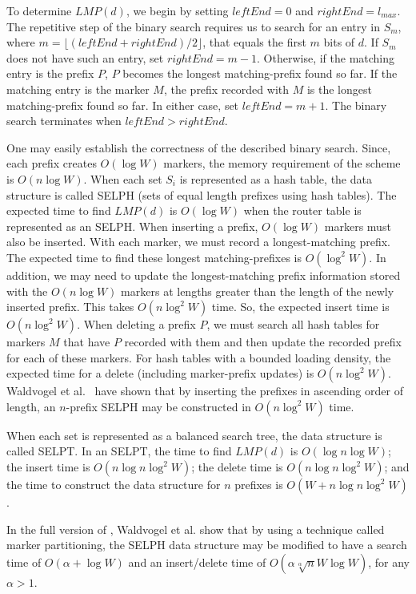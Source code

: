 To determine $LMP(d)$, we begin by setting $leftEnd = 0$ and
$rightEnd = l_{max}$. The repetitive step of the binary search requires us
to search for an entry in $S_m$, where $m =
\lfloor (leftEnd + rightEnd)/2\rfloor$, that equals the first $m$ bits of $d$.
If $S_m$ does not have such an entry, set $rightEnd = m - 1$. Otherwise,
if the matching entry is the prefix $P$, $P$ becomes the longest matching-prefix
found so far. If the matching entry is the marker $M$, the prefix recorded
with $M$ is the longest matching-prefix found so far. In either case,
set $leftEnd = m + 1$.
The binary search terminates when $leftEnd > rightEnd$.

One may easily establish the correctness of the described binary search.
Since, each prefix creates $O(\log W)$ markers, the memory requirement of
the scheme is $O(n \log W)$. When each set $S_i$ is represented as a hash
table, the data structure is called SELPH (sets of equal length prefixes
using hash tables).
The expected time to find $LMP(d)$ is $O(\log W)$ when the router
table is represented as an SELPH. When
inserting a prefix, $O(\log W)$ markers must also be inserted.
With each marker, we must record a longest-matching prefix. The
expected time to find these longest matching-prefixes is $O(\log^2 W)$.
In addition, we may need to update the longest-matching prefix information
stored with the $O(n\log W)$ markers at lengths greater
than the length of the newly inserted
prefix.
This takes $O(n\log^2 W)$ time.
So, the expected insert time is $O(n\log^2 W)$.
When deleting a prefix $P$, we must search all hash tables for markers
$M$ that have $P$ recorded with them and then update the recorded prefix
for each of these markers. For hash tables with a bounded loading density,
the expected time for a delete (including marker-prefix updates)
is $O(n\log^2W)$.
Waldvogel et al.~\cite{wald} have shown that
by inserting the prefixes in ascending order of length, an $n$-prefix
SELPH may be constructed in $O(n\log^2 W)$ time.

When each set is represented as a balanced search tree, the data
structure is called SELPT.  In an SELPT, the time to find
$LMP(d)$ is $O(\log n \log W)$; the insert time is $O(n\log n \log^2 W)$;
the delete time is $O(n\log n \log^2 W)$; and
the time to construct the data structure for $n$ prefixes is
$O(W+ n\log n \log^2W)$.

In the full version of \cite{wald}, Waldvogel et al. show
that by using a technique called marker partitioning, the SELPH
data structure may be modified to have a search time of $O(\alpha + \log W)$
and an insert/delete time of $O(\alpha \sqrt[\alpha]{n} W \log W)$, for any
$\alpha > 1$.

